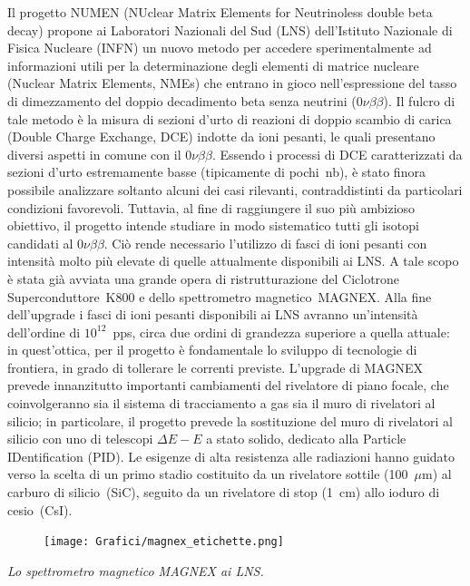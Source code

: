 \documentclass[10pt,foldmark,notumble]{leaflet}
\newcommand{\doppiobeta}{$ 0\nu\beta\beta$}
\begin{document}
Il progetto NUMEN (NUclear Matrix Elements for Neutrinoless double beta decay) propone ai Laboratori Nazionali del Sud (LNS) dell'Istituto Nazionale di Fisica Nucleare (INFN) un nuovo metodo per accedere sperimentalmente ad informazioni utili per la determinazione degli elementi di matrice nucleare (Nuclear Matrix Elements, NMEs) che entrano in gioco nell'espressione del tasso di dimezzamento del doppio decadimento beta senza neutrini (\doppiobeta).
Il fulcro di tale metodo è la misura di sezioni d'urto di reazioni di doppio scambio di carica (Double Charge Exchange, DCE) indotte da ioni pesanti, le quali presentano diversi aspetti in comune con il \doppiobeta.
Essendo i processi di DCE caratterizzati da sezioni d'urto estremamente basse (tipicamente di pochi~nb), è stato finora possibile analizzare soltanto alcuni dei casi rilevanti, contraddistinti da particolari condizioni favorevoli.
Tuttavia, al fine di raggiungere il suo più ambizioso obiettivo, il progetto intende studiare in modo sistematico tutti gli isotopi candidati al \doppiobeta{}.
Ciò rende necessario l'utilizzo di fasci di ioni pesanti con intensità molto più elevate di quelle attualmente disponibili ai LNS.
A tale scopo è stata già avviata una grande opera di ristrutturazione del Ciclotrone Superconduttore~K800 e dello spettrometro magnetico~MAGNEX.
Alla fine dell'upgrade i fasci di ioni pesanti disponibili ai LNS avranno un'intensità dell'ordine di $10^{12}$~pps, circa due ordini di grandezza superiore a quella attuale: in quest'ottica, per il progetto è fondamentale lo sviluppo di tecnologie di frontiera, in grado di tollerare le correnti previste.
L'upgrade di MAGNEX prevede innanzitutto importanti cambiamenti del rivelatore di piano focale, che coinvolgeranno sia il sistema di tracciamento a gas sia il muro di rivelatori al silicio; in particolare, il progetto prevede la sostituzione del muro di rivelatori al silicio con uno di telescopi $\Delta E - E$ a stato solido, dedicato alla Particle IDentification (PID). 
Le esigenze di alta resistenza alle radiazioni hanno guidato verso la scelta di un primo stadio costituito da un rivelatore sottile (100~$\mu$m) al carburo di silicio~(SiC), seguito da un rivelatore di stop (1~cm) allo ioduro di cesio~(CsI).

\begin{figure} [!h]
	\centering
	\texttt{[image: Grafici/magnex\_etichette.png]}
\end{figure}
\hspace{0.8 cm}\textit{ Lo spettrometro magnetico MAGNEX ai LNS.}
\end{document}
